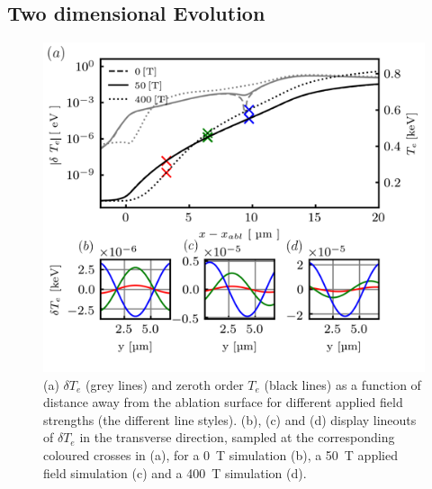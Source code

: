 \documentclass[aip,reprint]{revtex4-1}
\begin{document}
\subsection{Two dimensional Evolution}
\label{sec:2D}
\begin{figure}
		\includegraphics[width=1.0\columnwidth]{pics/plot_dT_4plots_2.png}
	\caption{\label{fig:dT} (a) $\delta T_e$ (grey lines) and zeroth order $T_e$ (black lines) as a function of distance away from the ablation surface for different applied field strengths (the different line styles). (b), (c) and (d) display lineouts of $\delta T_e$ in the transverse direction, sampled at the corresponding coloured crosses in (a), for a \SI{0}{T} simulation  (b), a \SI{50}{T} applied field simulation (c) and a \SI{400}{T} simulation (d). }%
\end{figure}
\end{document}
